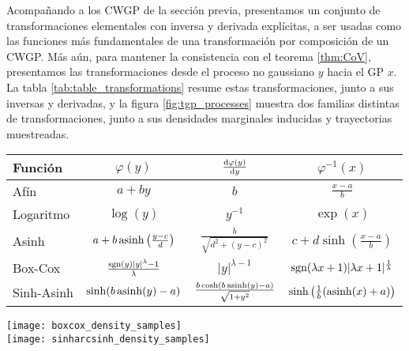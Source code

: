 Acompañando a los CWGP de la sección previa, presentamos un conjunto de transformaciones elementales con inversa y derivada explícitas, a ser usadas como las funciones más fundamentales de una transformación por composición de un CWGP. Más aún, para mantener la consistencia con el teorema \ref{thm:CoV}, presentamos las transformaciones desde el proceso no gaussiano \(y\) hacia el GP \(x\). La tabla \ref{tab:table_transformations} resume estas transformaciones, junto a sus inversas y derivadas, y la figura \ref{fig:tgp_processes} muestra dos familias distintas de transformaciones, junto a sus densidades marginales inducidas y trayectorias muestreadas.

\begin{table*}[h]
	\centering
	\label{tab:table_transformations}
	\begin{tabular}{l|ccc}
		Función		& \(\varphi(y)\)												& \(\dv{\varphi(y)}{y}\)								& \(\varphi^{-1}(x)\) \\
		\hline
		Afín		& \(a + by\)													& \(b\)													& \(\frac{x-a}{b}\)\\
		Logaritmo	& \(\log(y)\)													& \(y^{-1}\)											& \(\exp(x)\) \\
		Asinh		& \(a + b \operatorname{asinh}\left(\frac{y - c}{d}\right)\)					& \(\frac{b}{\sqrt{d^2 + (y-c)^{2}}}\)					& \(c + d\sinh\left(\frac{x - a}{b}\right)\) \\
		Box-Cox		& \(\frac{\operatorname{sgn}(y) \lvert y\rvert^{\lambda} - 1}{\lambda}\)		& \(\lvert y\rvert^{\lambda - 1}\)						& \(\operatorname{sgn}(\lambda x + 1) \lvert \lambda x + 1 \rvert^{\frac{1}{\lambda}}\) \\
		Sinh-Asinh	& \(\sinh(b\operatorname{asinh}(y) - a)\)										& \(\frac{b\cosh(b\operatorname{asinh}(y) - a)}{\sqrt{1 + y^{2}}}\)	& \(\sinh\left(\frac{1}{b} (\operatorname{asinh}(x) + a)\right)\) \\
	\end{tabular}
	\caption{Transformaciones elementales: formas funcionales con derivadas e inversas.}
\end{table*}

\begin{figure*}[h]
	\centering
	\texttt{[image: boxcox\_density\_samples]}\\
	\texttt{[image: sinharcsinh\_density\_samples]} %
	\caption{Transformaciones elementales Box-Cox y Sinh-Asinh propuestas. Para todos los gráficos, \(\mu\) denota la media del GP basal \(x\). Arriba: la transformación de Box-Cox en la ecuación \eqref{eq:box-cox-trans}. Abajo: la transformación Sinh-Asinh en la ecuación \eqref{eq:sinharcsinh-trans}. Izquierda: las transformaciones. Centro: las densidades marginales inducidas. Derecha: muestras del GP deformado.}
	\label{fig:tgp_processes}
\end{figure*}

